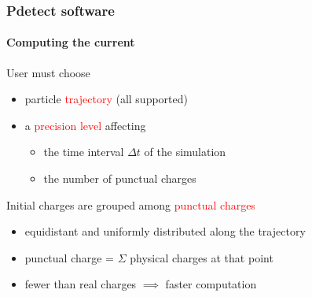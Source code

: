 \documentclass[14pt]{beamer}
\begin{document}
\begin{frame}
  \frametitle{Pdetect software}
  \framesubtitle{Computing the current}


\fontsize{13pt}{7.2}\selectfont


User must choose

\begin{itemize}
  \item particle \textcolor{red}{trajectory} (all supported)
  \item a \textcolor{red}{precision level} affecting
  \begin{itemize}
    \item the time interval $\Delta t$ of the simulation
    \item the number of punctual charges
  \end{itemize}
\end{itemize}

\vspace{1.5em}

Initial charges are grouped among \textcolor{red}{punctual charges}

\begin{itemize}
  \item equidistant and uniformly distributed along the trajectory
  \item punctual charge = $\Sigma$ physical charges at that point
  \item fewer than real charges $\implies$ faster computation
\end{itemize}

\end{frame}
\end{document}
